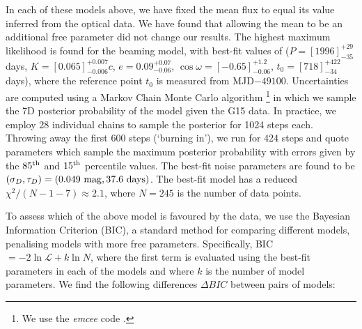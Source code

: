 In each of these models above, we have fixed the mean flux to equal
its value inferred from the optical data.  We have found that allowing
the mean to be an additional free parameter did not change our
results.  The highest maximum likelihood is found for the beaming
model, with best-fit values of
($P=\left[1996\right]^{+29}_{-35}$ days,
$K=\left[0.065\right]^{+0.007}_{-0.006} c$, 
$e ={0.09}^{+0.07}_{-0.06}$,
$\cos\omega=\left[-0.65\right]^{+1.2}_{-0.06}$, 
$t_0=\left[718\right]^{+422}_{-34}$ days), where the reference point
$t_0$ is measured from MJD$-49100$. 
Uncertainties are computed using a Markov Chain Monte Carlo algorithm \footnote{We use the \textit{emcee} code \cite{DFM:2013}.} in which we sample the 7D posterior probability of the model given the G15 data. In practice, we employ 28 individual chains to sample the posterior for 1024 steps each. Throwing away the first 600 steps (`burning in'), we run for 424 steps and quote parameters which sample the maximum posterior probability with errors given by the $85^{\rm th}$ and $15^{\rm th}$ percentile values.
%
%
The best-fit noise parameters are found to be $(\sigma_D,
\tau_D)=(0.049~{\rm mag}, 37.6~{\rm days})$.  The best-fit model has a
reduced $\chi^2/(N-1-7) \approx 2.1$, where $N=245$ is the number of
data points.

To assess which of the above model is favoured by the data, we use the
Bayesian Information Criterion (BIC), a standard method for comparing
different models, penalising models with more free
parameters\cite{KassRaftery1995}.  
 Specifically, BIC$=-2\ln\mathcal{L}
+ k \ln N$, where the first term is evaluated using the best-fit
parameters in each of the models and where $k$ is the number of model
parameters. We find the following differences $\Delta BIC$ between
pairs of models:

